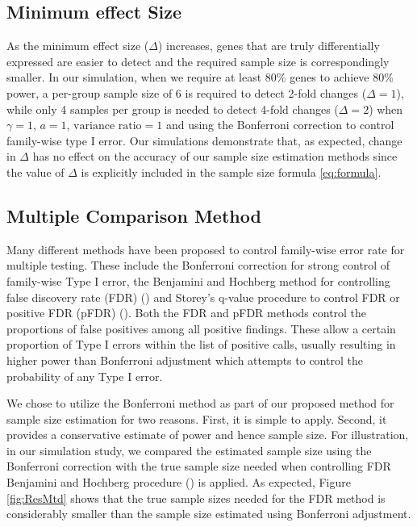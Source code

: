 \documentclass{bioinfo}
\begin{document}
\subsection{Minimum effect Size}

As the minimum effect size ($\Delta$) increases, genes that are
truly differentially expressed are easier to detect and the
required sample size is correspondingly smaller.  In our
simulation, when we require at least 80\% genes to achieve 80\%
power, a per-group sample size of 6 is required to detect 2-fold
changes ($\Delta = 1$), while only 4 samples per group is needed
to detect 4-fold changes ($\Delta = 2$) when $\gamma=1$, $a=1$,
$\text{variance ratio}=1$ and using the Bonferroni correction to
control family-wise type I error. Our simulations demonstrate
that, as expected, change in $\Delta$ has no effect on the
accuracy of our sample size estimation methods since the value of
$\Delta$ is explicitly included in the sample size formula
\ref{eq:formula}.

\subsection{Multiple Comparison Method}

Many different methods have been proposed to control family-wise
error rate for multiple testing.  These include the Bonferroni
correction for strong control of family-wise Type I error, the
Benjamini and Hochberg method for controlling false discovery rate
(FDR) (\citealp{Benjamini95}) and Storey's q-value procedure to
control FDR or positive FDR (pFDR) (\citealp{Storey02}).  Both the
FDR and pFDR methods control the proportions of false positives
among all positive findings.  These allow a certain proportion of
Type I errors within the list of positive calls, usually resulting
in higher power than Bonferroni adjustment which attempts to
control the probability of any Type I error.

We chose to utilize the Bonferroni method as part of our proposed
method for sample size estimation for two reasons. First, it is
simple to apply.  Second, it provides a conservative estimate of
power and hence sample size.  For illustration, in our simulation
study, we compared the estimated sample size using the Bonferroni
correction with the true sample size needed when controlling FDR
Benjamini and Hochberg procedure (\citealp{Benjamini95}) is
applied. As expected, Figure \ref{fig:ResMtd} shows that the true
sample sizes needed for the FDR method is considerably smaller
than the sample size estimated using Bonferroni adjustment.
\end{document}
